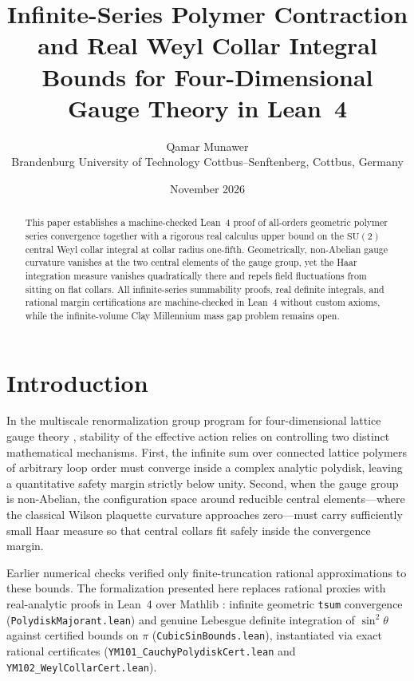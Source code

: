 \documentclass[11pt,a4paper]{article}
\title{Infinite-Series Polymer Contraction and Real Weyl Collar Integral Bounds for Four-Dimensional Gauge Theory in Lean~4}
\author{Qamar Munawer \\ \small Brandenburg University of Technology Cottbus--Senftenberg, Cottbus, Germany}
\date{November 2026}
\newcommand{\SU}{\mathrm{SU}}
\begin{document}
\maketitle

\begin{abstract}
This paper establishes a machine-checked Lean~4 proof of all-orders geometric polymer series convergence together with a rigorous real calculus upper bound on the $\SU(2)$ central Weyl collar integral at collar radius one-fifth. Geometrically, non-Abelian gauge curvature vanishes at the two central elements of the gauge group, yet the Haar integration measure vanishes quadratically there and repels field fluctuations from sitting on flat collars. All infinite-series summability proofs, real definite integrals, and rational margin certifications are machine-checked in Lean~4 without custom axioms, while the infinite-volume Clay Millennium mass gap problem remains open.
\end{abstract}

\section{Introduction}
In the multiscale renormalization group program for four-dimensional lattice gauge theory \cite{Balaban1988CMP116,Balaban1989CMP122,KoteckyPreiss1986}, stability of the effective action relies on controlling two distinct mathematical mechanisms. First, the infinite sum over connected lattice polymers of arbitrary loop order must converge inside a complex analytic polydisk, leaving a quantitative safety margin strictly below unity. Second, when the gauge group is non-Abelian, the configuration space around reducible central elements---where the classical Wilson plaquette curvature approaches zero---must carry sufficiently small Haar measure so that central collars fit safely inside the convergence margin.

Earlier numerical checks verified only finite-truncation rational approximations to these bounds. The formalization presented here replaces rational proxies with real-analytic proofs in Lean~4 over Mathlib \cite{Mathlib4}: infinite geometric \texttt{tsum} convergence (\texttt{PolydiskMajorant.lean}) and genuine Lebesgue definite integration of $\sin^2\theta$ against certified bounds on $\pi$ (\texttt{CubicSinBounds.lean}), instantiated via exact rational certificates (\texttt{YM101\_\-CauchyPolydiskCert.lean} and \texttt{YM102\_\-WeylCollarCert.lean}).
\end{document}
